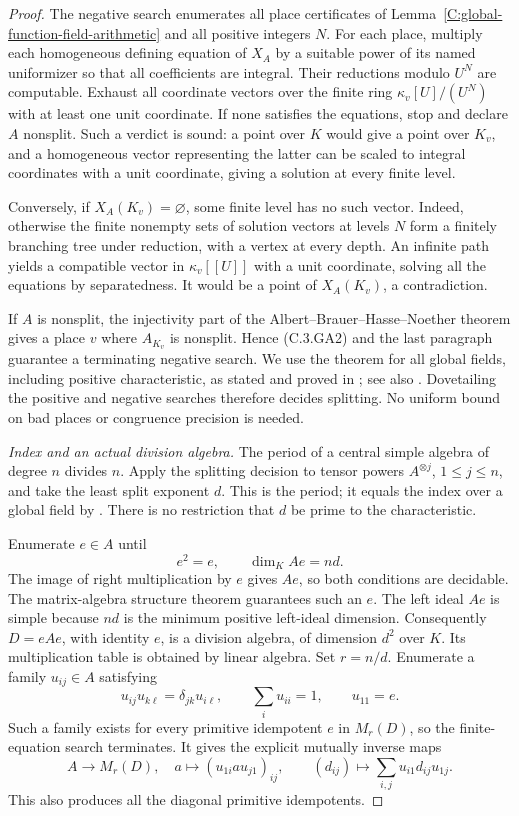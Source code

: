 \begin{proof}
The negative search enumerates all place certificates of
Lemma~\ref{C:global-function-field-arithmetic} and all
positive integers $N$. For each place, multiply each
homogeneous defining equation of $X_A$ by a suitable power
of its named uniformizer so that all coefficients are
integral. Their reductions modulo $U^N$ are computable.
Exhaust all coordinate vectors over the finite ring
$\kappa_v[U]/(U^N)$ with at least one unit coordinate.
If none satisfies the equations, stop and declare $A$
nonsplit. Such a verdict is sound: a point over $K$ would
give a point over $K_v$, and a homogeneous vector representing
the latter can be scaled to integral coordinates with a
unit coordinate, giving a solution at every finite level.

Conversely, if $X_A(K_v)=\varnothing$, some finite level
has no such vector. Indeed, otherwise the finite nonempty
sets of solution vectors at levels $N$ form a finitely
branching tree under reduction, with a vertex at every
depth. An infinite path yields a compatible vector in
$\kappa_v[[U]]$ with a unit coordinate, solving all the
equations by separatedness. It would be a point of
$X_A(K_v)$, a contradiction.

If $A$ is nonsplit, the injectivity part of the
Albert--Brauer--Hasse--Noether theorem gives a place $v$
where $A_{K_v}$ is nonsplit. Hence (C.3.GA2) and the last
paragraph guarantee a terminating negative search.
We use the theorem for all global fields, including
positive characteristic, as stated and proved in
\cite[Theorem 1.5.36(i), pp.\ 25--26]{C-PoonenRationalPoints2017};
see also \cite[Section 2]{C-HurlimannABHN1992}.
Dovetailing the positive and negative searches therefore
decides splitting. No uniform bound on bad places or
congruence precision is needed.

\emph{Index and an actual division algebra.}
The period of a central simple algebra of degree $n$
divides $n$. Apply the splitting decision to tensor powers
$A^{\otimes j}$, $1\leq j\leq n$, and take the least
split exponent $d$. This is the period; it equals the
index over a global field by
\cite[Proposition 1.5.17 and Theorem 1.5.36(iv)]
{C-PoonenRationalPoints2017}. There is no restriction that
$d$ be prime to the characteristic.

Enumerate $e\in A$ until
\[
                    e^2=e,
              \qquad \dim_K Ae=nd.                    \tag{C.3.GA3}
\]
The image of right multiplication by $e$ gives $Ae$, so
both conditions are decidable. The matrix-algebra structure
theorem guarantees such an $e$. The left ideal $Ae$ is
simple because $nd$ is the minimum positive left-ideal
dimension. Consequently $D=eAe$, with identity $e$, is a
division algebra, of dimension $d^2$ over $K$.
Its multiplication table is obtained by linear algebra.
Set $r=n/d$. Enumerate a family $u_{ij}\in A$ satisfying
\[
 u_{ij}u_{k\ell}=\delta_{jk}u_{i\ell},\qquad
 \sum_i u_{ii}=1,\qquad u_{11}=e.
\]
Such a family exists for every primitive idempotent $e$
in $M_r(D)$, so the finite-equation search terminates.
It gives the explicit mutually inverse maps
\[
 A\longrightarrow M_r(D),\quad
 a\longmapsto (u_{1i}a u_{j1})_{ij},
 \qquad
 (d_{ij})\longmapsto\sum_{i,j}u_{i1}d_{ij}u_{1j}.
\]
This also produces all the diagonal primitive idempotents.


\end{proof}
